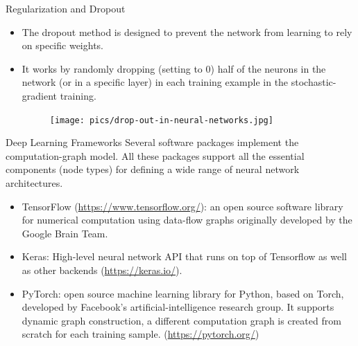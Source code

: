 \documentclass[handout]{beamer}
\begin{document}
\begin{frame}{Regularization and Dropout}
\begin{scriptsize}
\begin{itemize}

\item The dropout method is designed to prevent the network from learning to rely on specific weights.

\item It works by randomly dropping (setting to 0) half of the neurons in the network (or in a specific layer) in each training example in the stochastic-gradient training.


 \begin{figure}[htb]
	\centering
	 \texttt{[image: pics/drop-out-in-neural-networks.jpg]}
\end{figure}


\end{itemize}
\end{scriptsize}
\end{frame}



\begin{frame}{Deep Learning Frameworks}
Several software packages implement the computation-graph model. All these packages support all the essential components (node types) for defining a wide range of neural network architectures.
\begin{scriptsize}
\begin{itemize}
\item TensorFlow (\url{https://www.tensorflow.org/}): an open source software library for numerical computation using data-flow graphs originally developed by the Google Brain Team. 

\item Keras: High-level neural network API that runs on top of Tensorflow as well as other backends (\url{https://keras.io/}). 

\item PyTorch: open source machine learning library for Python, based on Torch, developed by Facebook's artificial-intelligence research group. It supports dynamic graph construction, a different computation graph is created from scratch for each training sample. (\url{https://pytorch.org/})


\end{itemize}
\end{scriptsize}
\end{frame}
\end{document}
